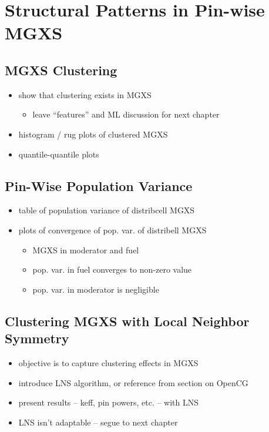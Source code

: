 \chapter{Structural Patterns in Pin-wise MGXS}
\label{chap:spatial}

\section{MGXS Clustering}

\begin{itemize}[noitemsep]
  \item show that clustering exists in MGXS
  \begin{itemize}[noitemsep]
    \item leave ``features'' and ML discussion for next chapter
  \end{itemize}
  \item histogram / rug plots of clustered MGXS
  \item quantile-quantile plots  
\end{itemize}


\section{Pin-Wise Population Variance}

\begin{itemize}[noitemsep]
  \item table of population variance of distribcell MGXS
  \item plots of convergence of pop. var. of distribell MGXS
  \begin{itemize}[noitemsep]
    \item MGXS in moderator and fuel
    \item pop. var. in fuel converges to non-zero value
    \item pop. var. in moderator is negligible
  \end{itemize}
\end{itemize}


\section{Clustering MGXS with Local Neighbor Symmetry}

\begin{itemize}[noitemsep]
  \item objective is to capture clustering effects in MGXS
  \item introduce LNS algorithm, or reference from section on OpenCG
  \item present results -- keff, pin powers, etc. -- with LNS
  \item LNS isn't adaptable -- segue to next chapter
\end{itemize}
